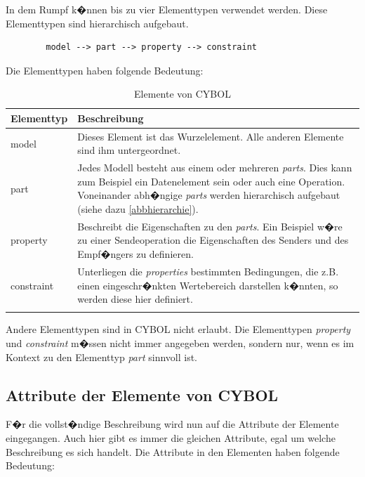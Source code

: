       In dem Rumpf k�nnen bis zu vier Elementtypen verwendet werden. Diese Elementtypen
      sind hierarchisch aufgebaut.
\begin{verbatim}
        model --> part --> property --> constraint
\end{verbatim}
      Die Elementtypen haben folgende Bedeutung:
          \begin{longtable}{|l|p{10cm}|}
            \hline
            \textbf{Elementtyp} & \textbf{Beschreibung}
            \\ \hline
            model & 
            Dieses Element ist das Wurzelelement. Alle anderen Elemente sind ihm untergeordnet.
            \\ \hline
            part & 
            Jedes Modell besteht aus einem oder mehreren \emph{parts}. Dies kann zum Beispiel ein
            Datenelement sein oder auch eine Operation. Voneinander abh�ngige \emph{parts}
            werden hierarchisch aufgebaut (siehe dazu \ref{abbhierarchie}).
            \\ \hline
            property & 
            Beschreibt die Eigenschaften zu den \emph{parts}. Ein Beispiel w�re zu einer
            Sendeoperation die Eigenschaften des Senders und des Empf�ngers 
            zu definieren.
            \\ \hline
            constraint & 
            Unterliegen die \emph{properties} bestimmten Bedingungen, 
            die z.B. einen eingeschr�nkten Wertebereich 
            darstellen k�nnten, so werden diese hier definiert.
            \\ \hline
            \caption{Elemente von CYBOL}
            \label{tab:ElementeVonCYBOL}
          \end{longtable}
      Andere Elementtypen sind in CYBOL nicht erlaubt. 
      Die Elementtypen \emph{property} und \emph{constraint} m�ssen
      nicht immer angegeben werden, sondern nur, wenn es im Kontext zu den Elementtyp \emph{part} sinnvoll ist. 

    \subsection{Attribute der Elemente von CYBOL}
      F�r die vollst�ndige Beschreibung wird nun auf die Attribute der Elemente eingegangen.
      Auch hier gibt es immer die gleichen Attribute, egal um welche Beschreibung es sich handelt.
      Die Attribute in den Elementen haben folgende Bedeutung:
      

